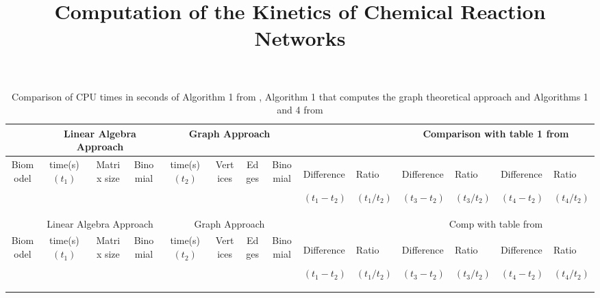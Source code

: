 \documentclass[11pt]{article}
\begin{document}
\begin{landscape}
\title{Computation of the Kinetics of Chemical Reaction Networks}
\date{}
\author{}
\maketitle
\setlength{\tabcolsep}{2pt}
\begin{small}
\begin{longtable}[c]{| c | c | c | c |c |c |c |c |p{1.5cm} |p{1.5cm} |p{1.5cm} |p{1.5cm} |p{1.5cm} |p{1.5cm} |}

 \caption{Comparison of CPU times in seconds of Algorithm 1 from \cite{rahkooy2020linear}, Algorithm 1 that computes the graph theoretical approach and Algorithms 1 and 4 from \cite{grigoriev2019efficiently}\label{t:res}}\\

 \hline
  & \multicolumn{3}{|c|}{Linear Algebra Approach} & \multicolumn{4}{|c|}{Graph Approach} &\multicolumn{2}{|c|}{}&\multicolumn{4}{|c|}{Comparison with table 1 from \cite{grigoriev2019efficiently}}\\
 \hline
 Biomodel & time(s)$(t_{1})$ & Matrix size & Binomial &  time(s)$(t_{2})$ & Vertices & Edges &Binomial & Difference \par$(t_{1}-t_{2})$ & Ratio\par$(t_{1}/t_{2})$ & Difference \par$(t_{3}-t_{2})$&Ratio\par$(t_{3}/t_{2})$ &Difference\par$(t_{4}-t_{2})$ &Ratio\par$(t_{4}/t_{2})$\\
 \hline
 \endfirsthead

 \hline
 &\multicolumn{3}{|c|}{Linear Algebra Approach}& \multicolumn{4}{|c|}{Graph Approach}&\multicolumn{2}{|c|}{}&\multicolumn{4}{|c|}{Comp with table from }\\
 \hline
 Biomodel & time(s)$(t_{1})$ & Matrix size & Binomial& time(s)$(t_{2})$ & Vertices & Edges &Binomial& Difference\par$(t_{1}-t_{2})$ & Ratio\par$(t_{1}/t_{2})$& Difference\par$(t_{3}-t_{2})$&Ratio\par$(t_{3}/t_{2})$ &Difference\par$(t_{4}-t_{2})$ &Ratio\par$(t_{4}/t_{2})$\\
 \hline
 \endhead


\end{longtable}
\end{small}
\end{landscape}
\end{document}
